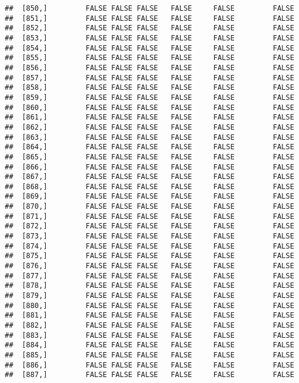 \documentclass[
]{article}
\begin{document}
\begin{verbatim}
##  [850,]         FALSE FALSE FALSE   FALSE     FALSE         FALSE
##  [851,]         FALSE FALSE FALSE   FALSE     FALSE         FALSE
##  [852,]         FALSE FALSE FALSE   FALSE     FALSE         FALSE
##  [853,]         FALSE FALSE FALSE   FALSE     FALSE         FALSE
##  [854,]         FALSE FALSE FALSE   FALSE     FALSE         FALSE
##  [855,]         FALSE FALSE FALSE   FALSE     FALSE         FALSE
##  [856,]         FALSE FALSE FALSE   FALSE     FALSE         FALSE
##  [857,]         FALSE FALSE FALSE   FALSE     FALSE         FALSE
##  [858,]         FALSE FALSE FALSE   FALSE     FALSE         FALSE
##  [859,]         FALSE FALSE FALSE   FALSE     FALSE         FALSE
##  [860,]         FALSE FALSE FALSE   FALSE     FALSE         FALSE
##  [861,]         FALSE FALSE FALSE   FALSE     FALSE         FALSE
##  [862,]         FALSE FALSE FALSE   FALSE     FALSE         FALSE
##  [863,]         FALSE FALSE FALSE   FALSE     FALSE         FALSE
##  [864,]         FALSE FALSE FALSE   FALSE     FALSE         FALSE
##  [865,]         FALSE FALSE FALSE   FALSE     FALSE         FALSE
##  [866,]         FALSE FALSE FALSE   FALSE     FALSE         FALSE
##  [867,]         FALSE FALSE FALSE   FALSE     FALSE         FALSE
##  [868,]         FALSE FALSE FALSE   FALSE     FALSE         FALSE
##  [869,]         FALSE FALSE FALSE   FALSE     FALSE         FALSE
##  [870,]         FALSE FALSE FALSE   FALSE     FALSE         FALSE
##  [871,]         FALSE FALSE FALSE   FALSE     FALSE         FALSE
##  [872,]         FALSE FALSE FALSE   FALSE     FALSE         FALSE
##  [873,]         FALSE FALSE FALSE   FALSE     FALSE         FALSE
##  [874,]         FALSE FALSE FALSE   FALSE     FALSE         FALSE
##  [875,]         FALSE FALSE FALSE   FALSE     FALSE         FALSE
##  [876,]         FALSE FALSE FALSE   FALSE     FALSE         FALSE
##  [877,]         FALSE FALSE FALSE   FALSE     FALSE         FALSE
##  [878,]         FALSE FALSE FALSE   FALSE     FALSE         FALSE
##  [879,]         FALSE FALSE FALSE   FALSE     FALSE         FALSE
##  [880,]         FALSE FALSE FALSE   FALSE     FALSE         FALSE
##  [881,]         FALSE FALSE FALSE   FALSE     FALSE         FALSE
##  [882,]         FALSE FALSE FALSE   FALSE     FALSE         FALSE
##  [883,]         FALSE FALSE FALSE   FALSE     FALSE         FALSE
##  [884,]         FALSE FALSE FALSE   FALSE     FALSE         FALSE
##  [885,]         FALSE FALSE FALSE   FALSE     FALSE         FALSE
##  [886,]         FALSE FALSE FALSE   FALSE     FALSE         FALSE
##  [887,]         FALSE FALSE FALSE   FALSE     FALSE         FALSE

\end{verbatim}
\end{document}
